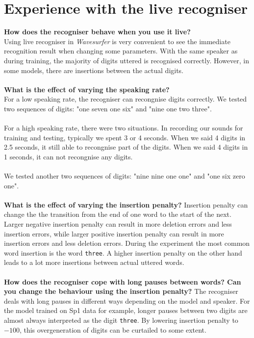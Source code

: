 \documentclass[onecolumn]{article}
\begin{document}
\section*{Experience with the live recogniser}
\noindent \textbf{How does the recogniser behave when you use it live?}
\\[1mm]
Using live recogniser in \emph{Wavesurfer} is very convenient to see the immediate recognition result when changing some parameters. With the same speaker as during training, the majority of digits uttered is recognised correctly. However, in some models, %
there are insertions between the actual digits.\\
\\
\noindent \textbf{What is the effect of varying the speaking rate?}\\
For a low speaking rate, the recogniser can recongnise digits correctly. 
We tested two sequences of digits: "one seven one six" and "nine one two three". \\
\\
For a high speaking rate, there were two situations. 
In recording our sounds for training and testing, typically we spent 3 or 4 seconds.
When we said 4 digits in 2.5 seconds, it still able to recongnise part of the digits.
When we said 4 digits in 1 seconds, it can not recongnise any digits.\\
\\
We tested another two sequences of digits: "nine nine one one" and "one six zero one".
\\
\\
\textbf{What is the effect of varying the insertion penalty?}
Insertion penalty can change the the transition from the end of one word to the start of the next. Larger negative insertion penalty can result in more deletion errors and less insertion errors, while larger positive insertion penalty can result in more insertion errors and less deletion errors. During the experiment the most common word insertion is the word \texttt{three}. A higher insertion penalty on the other hand leads to a lot more insertions between actual uttered words.\\
\\

\noindent \textbf{How does the recogniser cope with long pauses between words? Can you change the behaviour using the insertion penalty?}%
The recogniser deals with long pauses in different ways depending on the model and speaker. For the model trained on Sp1 data for example, longer pauses between two digits are almost always interpreted as the digit \texttt{three}. By lowering insertion penalty to $-100$, this overgeneration of digits can be curtailed to some extent.\\ %
\end{document}
